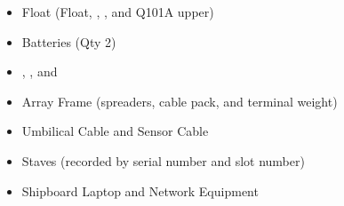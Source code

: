 	\begin{itemize}
		\item Float (Float, \GPS, \Iridium, and Q101A upper)
		\item Batteries (Qty 2)
		\item \SFEC, \USEC, and \LSEC
		\item Array Frame (spreaders, cable pack, and terminal weight)
		\item Umbilical Cable and Sensor Cable
		\item Staves (recorded by serial number and slot number)
		\item Shipboard Laptop and Network Equipment
	\end{itemize}